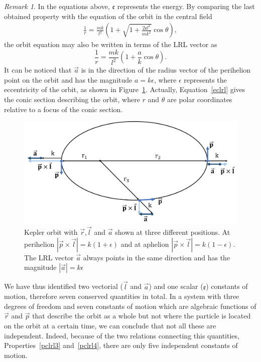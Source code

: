 \documentclass[12pt,a4paper]{report}
\theoremstyle{definition}
\theoremstyle{remark}
\newtheorem*{remark}{Remark}
\theoremstyle{remark}
\begin{document}
\begin{remark}
In the equations above, $\mathfrak{e}$ represents the energy. By comparing the last obtained property with the equation of the orbit in the central field \cite{goldstein}
\begin{align*}
\frac{1}{r}=\frac{mk}{l^2}\left(1+\sqrt{1+\frac{2\mathfrak{e}l^2}{mk^2}}\cos\theta\right),
\end{align*}
the orbit equation may also be written in terms of the LRL vector as
\begin{equation}\label{eclrl}
\frac{1}{r}=\frac{mk}{l^2}\left(1+\frac{a}{k}\cos\theta\right).
\end{equation}
It can be noticed that $\vec{a}$ is in the direction of the radius vector of the perihelion point on the orbit and has the magnitude $a=k\epsilon$, where $\epsilon$ represents the eccentricity of the orbit, as shown in Figure~\ref{fig:clrl}. Actually, Equation~\ref{eclrl} gives the conic section describing the orbit, where $r$ and $\theta$ are polar coordinates relative to a focus of the conic section.
\end{remark}

\begin{figure}[!hbt]
\begin{center}
\includegraphics[width=0.9\columnwidth]{clrl.png}
\caption{Kepler orbit with $\vec{r}$,$\vec{l}$ and $\vec{a}$ shown at three different positions. At perihelion $|\vec{p}\times\vec{l}|=k(1+\epsilon)$ and at aphelion $|\vec{p}\times\vec{l}|=k(1-\epsilon)$. The LRL vector $\vec{a}$ always points in the same direction and has the magnitude $|\vec{a}|=k\epsilon$}
\label{fig:clrl}
\end{center}
\end{figure}

We have thus identified two vectorial ($\vec{l}$ and $\vec{a}$) and one scalar ($\mathfrak{e}$) constants of motion, therefore seven conserved quantities in total. In a system with three degrees of freedom and seven constants of motion which are algebraic functions of $\vec{r}$ and $\vec{p}$ that describe the orbit as a whole but not where the particle is located on the orbit at a certain time, we can conclude that not all these are independent. Indeed, because of the two relations connecting this quantities, Properties~\ref{pclrl3} and~\ref{pclrl4}, there are only five independent constants of motion.
\end{document}
